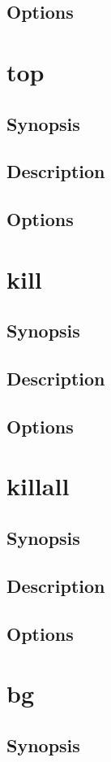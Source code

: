 \documentclass[a4paper, 10pt, onecolumn, openright, oneside]{book}
\begin{document}
			\subsection{Options}
		\section{top}
			\subsection{Synopsis}
			\subsection{Description}
			\subsection{Options}
		\section{kill}
			\subsection{Synopsis}
			\subsection{Description}
			\subsection{Options}
		\section{killall}
			\subsection{Synopsis}
			\subsection{Description}
			\subsection{Options}
		\section{bg}
			\subsection{Synopsis}
\end{document}
